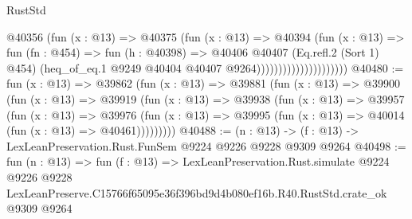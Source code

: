 \begin{lexlean}{RustStd}
\begin{coremodule}
                                    @40356
                                      (fun (x : @13) =>
                                      @40375
                                        (fun (x : @13) =>
                                        @40394
                                          (fun (x : @13) =>
                                          fun (fn : @454) =>
                                          fun (h : @40398) =>
                                          @40406
                                            @40407
                                            (Eq.refl.{2} (Sort 1) @454)
                                            (heq_of_eq.{1}
                                              @9249
                                              @40404
                                              @40407
                                              @9264)))))))))))))))))))))
@40480 := fun (x : @13) =>
  @39862
    (fun (x : @13) =>
    @39881
      (fun (x : @13) =>
      @39900
        (fun (x : @13) =>
        @39919
          (fun (x : @13) =>
          @39938
            (fun (x : @13) =>
            @39957
              (fun (x : @13) =>
              @39976
                (fun (x : @13) => @39995 (fun (x : @13) => @40014 (fun (x : @13) => @40461)))))))))
@40488 := (n : @13) -> (f : @13) -> LexLeanPreservation.Rust.FunSem @9224 @9226 @9228 @9309 @9264
@40498 := fun (n : @13) =>
  fun (f : @13) =>
  LexLeanPreservation.Rust.simulate
    @9224
    @9226
    @9228
    LexLeanPreserve.C15766f65095e36f396bd9d4b080ef16b.R40.RustStd.crate_ok
    @9309
    @9264
\end{coremodule}
\end{lexlean}
